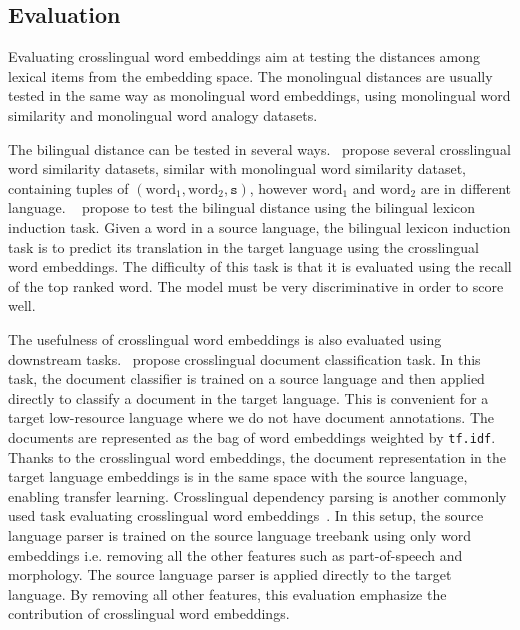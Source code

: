 \documentclass[12pt,twoside,final,hidelinks]{ltthesis}
\theoremstyle{definition}
\begin{document}
\subsection{Evaluation}
Evaluating crosslingual word embeddings aim at testing the distances among lexical items from the embedding space. 
The monolingual distances are usually tested in the same way as monolingual word embeddings, using
monolingual word similarity and monolingual word analogy datasets. 

The bilingual distance can be tested in several ways.~ propose 
several crosslingual word similarity datasets, similar with monolingual word similarity dataset, containing tuples 
of $(\text{word}_1,\text{word}_2,\texttt{s})$, however $\text{word}_1$ and $\text{word}_2$ are in different language. 
~ propose to test the bilingual distance using the bilingual lexicon induction task. 
Given a word in a source language, the bilingual lexicon induction task is to predict its translation in the target language 
using the crosslingual word embeddings. The difficulty of this task is that it is evaluated using the recall of the top ranked word. 
The model must be very discriminative in order to score well.

The usefulness of crosslingual word embeddings is also evaluated using downstream tasks.~ propose
crosslingual document classification task. In this task, the document classifier is trained on a source language and then applied directly 
to classify a document in the target language. This is convenient for a target low-resource language where we do not have document annotations. 
The documents are represented as the bag of word embeddings weighted by \texttt{tf.idf}. Thanks to  the crosslingual word embeddings, the document 
representation in the target language embeddings is in the same space with the source language, enabling transfer learning. Crosslingual dependency 
parsing is another commonly used task evaluating crosslingual word embeddings~\cite{DBLP:AmmarMTLDS16,upadhyay-EtAl:2016:P16-1}. In this setup, 
the source language parser is trained on the source language treebank using only word embeddings i.e. removing all the other features 
such as part-of-speech and morphology. The source language parser is applied directly to the target language. By removing all other features, 
this evaluation emphasize the contribution of crosslingual word embeddings. 
\end{document}
